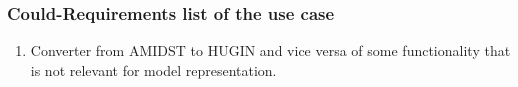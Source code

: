 \subsubsection*{Could-Requirements list of the use case}

\begin{enumerate}
\item Converter from AMIDST to HUGIN  and vice versa of some functionality that is not relevant for model representation.
\end{enumerate}


